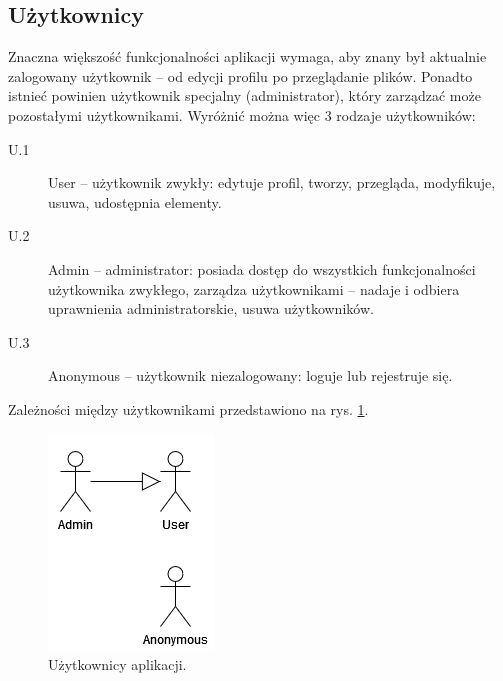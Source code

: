 \documentclass[a4paper,twoside,12pt]{book}
\begin{document}
\subsection{Użytkownicy}
Znaczna większość funkcjonalności aplikacji wymaga, aby znany był aktualnie zalogowany użytkownik -- od edycji profilu po przeglądanie plików. Ponadto istnieć powinien użytkownik specjalny (administrator), który zarządzać może pozostałymi użytkownikami. Wyróżnić można więc 3 rodzaje użytkowników:
\begin{description}
	\item [U.1] User -- użytkownik zwykły: edytuje profil, tworzy, przegląda, modyfikuje, usuwa, udostępnia elementy.
	\item [U.2] Admin -- administrator: posiada dostęp do wszystkich funkcjonalności użytkownika zwykłego, zarządza użytkownikami -- nadaje i odbiera uprawnienia administratorskie, usuwa użytkowników.
	\item [U.3] Anonymous -- użytkownik niezalogowany: loguje lub rejestruje się.
\end{description}	

Zależności między użytkownikami przedstawiono na rys. \ref{fig:uml-users}.

\begin{figure}
\centering
\includegraphics{./UML-Users.png}
\caption{Użytkownicy aplikacji.}
\label{fig:uml-users}
\end{figure}
\end{document}
